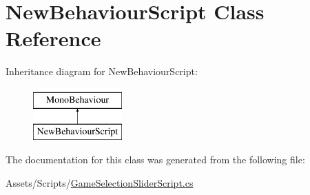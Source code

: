 \hypertarget{classNewBehaviourScript}{}\section{New\+Behaviour\+Script Class Reference}
\label{classNewBehaviourScript}
Inheritance diagram for New\+Behaviour\+Script\+:\begin{figure}[H]
\begin{center}
\leavevmode
\includegraphics[height=2.000000cm]{classNewBehaviourScript}
\end{center}
\end{figure}


The documentation for this class was generated from the following file\+:\begin{DoxyCompactItemize}
\item 
Assets/\+Scripts/\hyperlink{GameSelectionSliderScript_8cs}{Game\+Selection\+Slider\+Script.\+cs}\end{DoxyCompactItemize}
